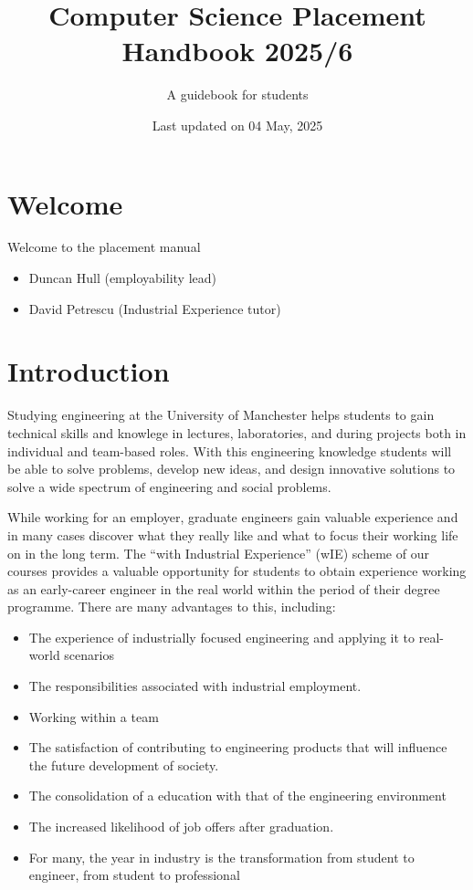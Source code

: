 \documentclass[
]{book}
\title{Computer Science Placement Handbook 2025/6}
\author{A guidebook for students}
\date{Last updated on 04 May, 2025}
\providecommand{\tightlist}{%
  \setlength{\itemsep}{0pt}\setlength{\parskip}{0pt}}
\begin{document}
\maketitle

{
\setcounter{tocdepth}{1}
\tableofcontents
}
\chapter*{Welcome}\label{welcome}

Welcome to the placement manual

\begin{itemize}
\tightlist
\item
  Duncan Hull (employability lead)
\item
  David Petrescu (Industrial Experience tutor)
\end{itemize}

\chapter{Introduction}\label{intro}

Studying engineering at the University of Manchester helps students to gain technical skills and knowlege in lectures, laboratories, and during projects both in individual and team-based roles. With this engineering knowledge students will be able to solve problems, develop new ideas, and design innovative solutions to solve a wide spectrum of engineering and social problems.

While working for an employer, graduate engineers gain valuable experience and in many cases discover what they really like and what to focus their working life on in the long term. The ``with Industrial Experience'' (wIE) scheme of our courses provides a valuable opportunity for students to obtain experience working as an early-career engineer in the real world within the period of their degree programme. There are many advantages to this, including:

\begin{itemize}
\tightlist
\item
  The experience of industrially focused engineering and applying it to real-world scenarios
\item
  The responsibilities associated with industrial employment.
\item
  Working within a team
\item
  The satisfaction of contributing to engineering products that will influence the future development of society.
\item
  The consolidation of a education with that of the engineering environment
\item
  The increased likelihood of job offers after graduation.
\item
  For many, the year in industry is the transformation from student to engineer, from student to professional
\end{itemize}
\end{document}

